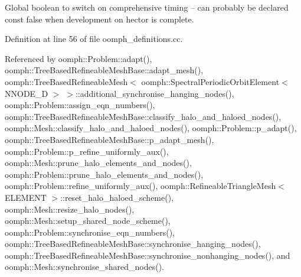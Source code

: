 Global boolean to switch on comprehensive timing -- can probably be declared const false when development on hector is complete. 



Definition at line 56 of file oomph\+\_\+definitions.\+cc.



Referenced by oomph\+::\+Problem\+::adapt(), oomph\+::\+Tree\+Based\+Refineable\+Mesh\+Base\+::adapt\+\_\+mesh(), oomph\+::\+Tree\+Based\+Refineable\+Mesh$<$ oomph\+::\+Spectral\+Periodic\+Orbit\+Element$<$ N\+N\+O\+D\+E\+\_\+D $>$ $>$\+::additional\+\_\+synchronise\+\_\+hanging\+\_\+nodes(), oomph\+::\+Problem\+::assign\+\_\+eqn\+\_\+numbers(), oomph\+::\+Tree\+Based\+Refineable\+Mesh\+Base\+::classify\+\_\+halo\+\_\+and\+\_\+haloed\+\_\+nodes(), oomph\+::\+Mesh\+::classify\+\_\+halo\+\_\+and\+\_\+haloed\+\_\+nodes(), oomph\+::\+Problem\+::p\+\_\+adapt(), oomph\+::\+Tree\+Based\+Refineable\+Mesh\+Base\+::p\+\_\+adapt\+\_\+mesh(), oomph\+::\+Problem\+::p\+\_\+refine\+\_\+uniformly\+\_\+aux(), oomph\+::\+Mesh\+::prune\+\_\+halo\+\_\+elements\+\_\+and\+\_\+nodes(), oomph\+::\+Problem\+::prune\+\_\+halo\+\_\+elements\+\_\+and\+\_\+nodes(), oomph\+::\+Problem\+::refine\+\_\+uniformly\+\_\+aux(), oomph\+::\+Refineable\+Triangle\+Mesh$<$ E\+L\+E\+M\+E\+N\+T $>$\+::reset\+\_\+halo\+\_\+haloed\+\_\+scheme(), oomph\+::\+Mesh\+::resize\+\_\+halo\+\_\+nodes(), oomph\+::\+Mesh\+::setup\+\_\+shared\+\_\+node\+\_\+scheme(), oomph\+::\+Problem\+::synchronise\+\_\+eqn\+\_\+numbers(), oomph\+::\+Tree\+Based\+Refineable\+Mesh\+Base\+::synchronise\+\_\+hanging\+\_\+nodes(), oomph\+::\+Tree\+Based\+Refineable\+Mesh\+Base\+::synchronise\+\_\+nonhanging\+\_\+nodes(), and oomph\+::\+Mesh\+::synchronise\+\_\+shared\+\_\+nodes().

